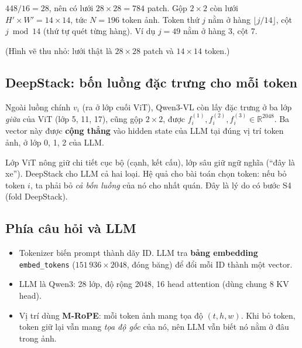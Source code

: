 \documentclass[11pt,a4paper]{article}
\newcommand{\R}{\mathbb{R}}
\newcommand{\file}[1]{\texttt{\small #1}}
\begin{document}
\begin{vidu}
$448/16=28$, nên có lưới $28\times28=784$ patch. Gộp $2\times2$ còn lưới $H'\times W'=14\times14$, tức $N=196$ token ảnh. Token thứ $j$ nằm ở hàng $\lfloor j/14\rfloor$, cột $j \bmod 14$ (thứ tự quét từng hàng). Ví dụ $j=49$ nằm ở hàng 3, cột 7.

\begin{center}
\end{center}
(Hình vẽ thu nhỏ: lưới thật là $28\times28$ patch và $14\times14$ token.)
\end{vidu}

\subsection{DeepStack: bốn luồng đặc trưng cho mỗi token}
Ngoài luồng chính $v_i$ (ra ở lớp cuối ViT), Qwen3-VL còn lấy đặc trưng ở ba lớp \emph{giữa} của ViT (lớp 5, 11, 17), cũng gộp $2\times2$, được $f_i^{(1)},f_i^{(2)},f_i^{(3)}\in\R^{2048}$. Ba vector này được \textbf{cộng thẳng} vào hidden state của LLM tại đúng vị trí token ảnh, ở lớp 0, 1, 2 của LLM.

\begin{trucgiac}
Lớp ViT nông giữ chi tiết cục bộ (cạnh, kết cấu), lớp sâu giữ ngữ nghĩa (``đây là xe''). DeepStack cho LLM cả hai loại. Hệ quả cho bài toán chọn token: nếu bỏ token $i$, ta phải bỏ \emph{cả bốn luồng} của nó cho nhất quán. Đây là lý do có bước S4 (fold DeepStack).
\end{trucgiac}

\subsection{Phía câu hỏi và LLM}
\begin{itemize}[leftmargin=*]
\item Tokenizer biến prompt thành dãy ID. LLM tra \textbf{bảng embedding} \file{embed\_tokens} ($151\,936\times2048$, đóng băng) để đổi mỗi ID thành một vector.
\item LLM là Qwen3: 28 lớp, độ rộng 2048, 16 head attention (dùng chung 8 KV head).
\item Vị trí dùng \textbf{M-RoPE}: mỗi token ảnh mang tọa độ $(t,h,w)$. Khi bỏ token, token giữ lại vẫn mang \emph{tọa độ gốc} của nó, nên LLM vẫn biết nó nằm ở đâu trong ảnh.
\end{itemize}
\end{document}
